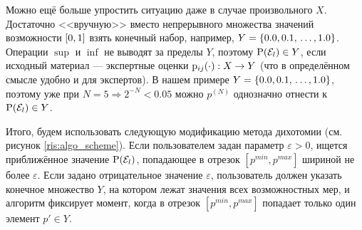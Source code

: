 
Можно ещё больше упростить ситуацию даже в случае произвольного $X$. Достаточно <<вручную>> вместо непрерывного множества значений возможности $[0,1]$ взять конечный набор, например, $Y = \{0.0, 0.1, \, \ldots, 1.0\}$. Операции $\sup$ и $\inf$ не выводят за пределы $Y$, поэтому ${\mathrm{P}}(\mathcal{E}_l) \in Y$, если исходный материал --- экспертные оценки ${\mathrm{p}}_{ij}(\cdot): X \rightarrow Y$ (что в определённом смысле удобно и для экспертов). В нашем примере $Y = \{0.0, 0.1, \, \ldots, 1.0\}$, поэтому уже при $N = 5 \Rightarrow 2^{-N} < 0.05$ можно $p^{(N)}$ однозначно отнести к ${\mathrm{P}}(\mathcal{E}_l) \in Y$.

Итого, будем использовать следующую модификацию метода дихотомии (см. рисунок \ref{ris:algo_scheme}). Если пользователем задан параметр $\varepsilon > 0$, ищется приближённое значение ${\mathrm{P}}(\mathcal{E}_l)$, попадающее в отрезок $[p^{min}, p^{max}]$ шириной не более $\varepsilon$. Если задано отрицательное значение $\varepsilon$, пользователь должен указать конечное множество $Y$, на котором лежат значения всех возможностных мер, и алгоритм фиксирует момент, когда в отрезок $[p^{min}, p^{max}]$ попадает только один элемент $p' \in Y$. %

